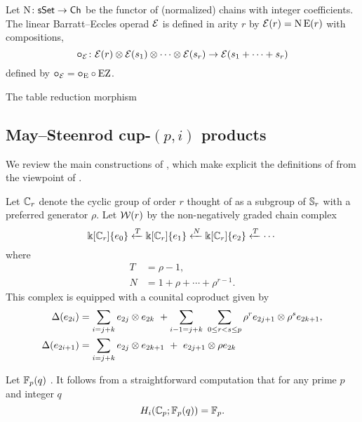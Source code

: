 \sssec

Let $\operatorname{N} \colon \mathsf{sSet} \to \mathsf{Ch}$ be the functor of (normalized) chains with integer coefficients.
The linear Barratt--Eccles operad $\mathcal{E}$ is defined in arity $r$ by $\mathcal{E}(r) = \operatorname{N}\mathrm{E}(r)$ with compositions,
\[
\bm{\circ}_{\mathcal{E}} \colon \mathcal{E}(r) \otimes \mathcal{E}(s_1) \otimes\dotsb\otimes \mathcal{E}(s_r) \to \mathcal{E}(s_1+\dots+s_r)
\]
defined by $\bm{\circ}_{\mathcal{E}} = \bm{\circ}_{\mathrm{E}} \circ \operatorname{EZ}$.

\sssec

The table reduction morphism \TBW

\subsection{May--Steenrod cup-$(p,i)$ products}

We review the main constructions of \cite{medina2021may_st}, which make explicit the definitions of \cite{steenrod1953cyclic} from the viewpoint of \cite{may1970general}.

\sssec

Let $\mathbb{C}_r$ denote the cyclic group of order $r$ thought of as a subgroup of $\mathbb{S}_r$ with a preferred generator $\rho$.
Let $\mathcal{W}(r)$ by the non-negatively graded chain complex
\begin{equation} \label{eq: minimal resolution}
	\Bbbk[\mathbb{C}_r]\{e_0\} \xleftarrow{T} \Bbbk[\mathbb{C}_r]\{e_1\} \xleftarrow{N} \Bbbk[\mathbb{C}_r]\{e_2\} \xleftarrow{T} \cdots
\end{equation}
where
\begin{equation} \label{eq: T and R definition}
	\begin{split}
		T &= \rho - 1, \\
		N &= 1 + \rho + \cdots + \rho^{r-1}.
	\end{split}
\end{equation}
This complex is equipped with a counital coproduct given by
\begin{align*}
	\Delta(e_{2i}) &=
	\sum_{i=j+k} e_{2j} \otimes e_{2k} \ + \sum_{i-1=j+k} \ \sum_{0 \leq r < s \leq p} \rho^r e_{2j+1} \otimes \rho^s e_{2k+1}, \\
	\Delta(e_{2i+1}) &=
	\sum_{i=j+k} e_{2j} \otimes e_{2k+1} \ +\ e_{2j+1} \otimes \rho e_{2k}
\end{align*}

\sssec

Let ${\mathbb{F}_p}(q)$ \TBW.
It follows from a straightforward computation that for any prime $p$ and integer $q$
\begin{equation*}
	H_i(\mathbb{C}_p; \mathbb{F}_p(q)) = \mathbb{F}_p.
\end{equation*}

